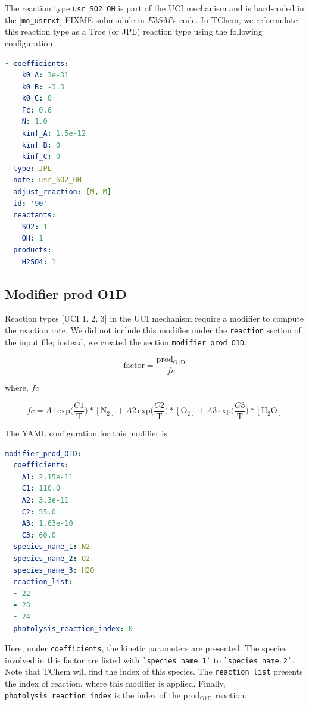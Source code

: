 \documentclass[report, 12pt]{SANDreport}
\newcommand{\eee}{E3SM}
\begin{document}
The reaction type \verb|usr_SO2_OH| is part of the UCI mechanism and is hard-coded in the [\verb|mo_usrrxt|]
FIXME%
submodule in $\eee$'s code. In TChem, we reformulate this reaction type as a Troe (or JPL) reaction type using the following configuration.

\begin{lstlisting}[language=yaml]
- coefficients:
    k0_A: 3e-31
    k0_B: -3.3
    k0_C: 0
    Fc: 0.6
    N: 1.0
    kinf_A: 1.5e-12
    kinf_B: 0
    kinf_C: 0
  type: JPL
  note: usr_SO2_OH
  adjust_reaction: [M, M]
  id: '90'
  reactants:
    SO2: 1
    OH: 1
  products:
    H2SO4: 1
\end{lstlisting}

\subsection{Modifier prod O1D}

Reaction types [UCI 1, 2, 3]
in the UCI mechanism require a modifier to compute the reaction rate. We did not include this modifier under the \verb|reaction| section of the input file; instead, we created the section \verb|modifier_prod_O1D|.

$$
\mathrm{factor} = \frac{\mathrm{prod_{O1D}}}{fc}
$$

where, $fc$

$$
fc = A1\, \mathrm{exp} \Big(\frac{C1}{\mathrm{T}} \Big) * [\mathrm{N_2}] +
A2\, \mathrm{exp} \Big(\frac{C2}{\mathrm{T}} \Big) * [\mathrm{O_2}] +
A3\, \mathrm{exp} \Big(\frac{C3}{\mathrm{T}} \Big) * [\mathrm{H_2O}]
$$

The YAML configuration for this modifier is :

\begin{lstlisting}[language=yaml]
modifier_prod_O1D:
  coefficients:
    A1: 2.15e-11
    C1: 110.0
    A2: 3.3e-11
    C2: 55.0
    A3: 1.63e-10
    C3: 60.0
  species_name_1: N2
  species_name_2: O2
  species_name_3: H2O
  reaction_list:
  - 22
  - 23
  - 24
  photolysis_reaction_index: 0
\end{lstlisting}
Here, under \verb|coefficients|, the kinetic parameters are presented. The species involved in this factor are listed with \verb|`species_name_1`| to \verb|`species_name_2`|. Note that TChem will find the index of this species. The \verb|reaction_list| presents the index of reaction, where this modifier is applied. Finally, \verb|photolysis_reaction_index| is the index of the $\mathrm{prod_{O1D}}$ reaction.
\end{document}
